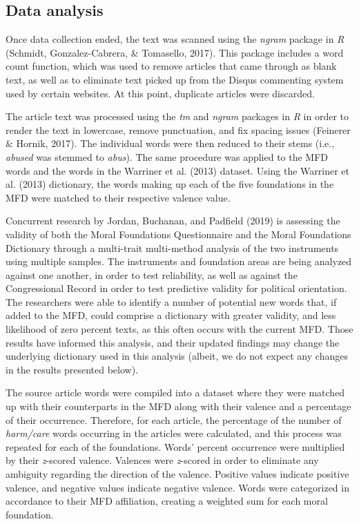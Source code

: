 \documentclass[english,,man]{apa6}
\begin{document}
\hypertarget{data-analysis}{%
\subsection{Data analysis}\label{data-analysis}}

Once data collection ended, the text was scanned using the \emph{ngram} package in \emph{R} (Schmidt, Gonzalez-Cabrera, \& Tomasello, 2017). This package includes a word count function, which was used to remove articles that came through as blank text, as well as to eliminate text picked up from the Disqus commenting system used by certain websites. At this point, duplicate articles were discarded.

The article text was processed using the \emph{tm} and \emph{ngram} packages in \emph{R} in order to render the text in lowercase, remove punctuation, and fix spacing issues (Feinerer \& Hornik, 2017). The individual words were then reduced to their stems (i.e., \emph{abused} was stemmed to \emph{abus}). The same procedure was applied to the MFD words and the words in the Warriner et al. (2013) dataset. Using the Warriner et al. (2013) dictionary, the words making up each of the five foundations in the MFD were matched to their respective valence value.

Concurrent research by Jordan, Buchanan, and Padfield (2019) is assessing the validity of both the Moral Foundations Questionnaire and the Moral Foundations Dictionary through a multi-trait multi-method analysis of the two instruments using multiple samples. The instruments and foundation areas are being analyzed against one another, in order to test reliability, as well as against the Congressional Record in order to test predictive validity for political orientation. The researchers were able to identify a number of potential new words that, if added to the MFD, could comprise a dictionary with greater validity, and less likelihood of zero percent texts, as this often occurs with the current MFD. Those results have informed this analysis, and their updated findings may change the underlying dictionary used in this analysis (albeit, we do not expect any changes in the results presented below).

The source article words were compiled into a dataset where they were matched up with their counterparts in the MFD along with their valence and a percentage of their occurrence. Therefore, for each article, the percentage of the number of \emph{harm/care} words occurring in the articles were calculated, and this process was repeated for each of the foundations. Words' percent occurrence were multiplied by their \emph{z}-scored valence. Valences were \emph{z}-scored in order to eliminate any ambiguity regarding the direction of the valence. Positive values indicate positive valence, and negative values indicate negative valence. Words were categorized in accordance to their MFD affiliation, creating a weighted sum for each moral foundation.
\end{document}

